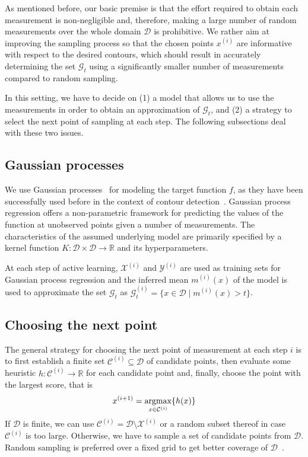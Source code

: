 \documentclass[11pt]{article} %
\newcommand{\argmax}{\operatornamewithlimits{argmax}}
\begin{document}
As mentioned before, our basic premise is that the effort required to obtain
each measurement is
non-negligible and, therefore, making a large number of random measurements
over the whole domain $\mathcal{D}$ is prohibitive. We rather aim at improving
the sampling process so that the chosen points $x^{(i)}$ are informative with
respect to the desired contours, which should result in accurately determining
the set $\mathcal{G}_t$ using a significantly smaller number of measurements
compared to random sampling.

In this setting, we have to decide on (1) a model that allows us to use the
measurements in order to obtain an approximation of $\mathcal{G}_t$, and (2) a
strategy to select the next point of sampling at each step. The following
subsections deal with these two issues.

\subsection{Gaussian processes}
We use Gaussian processes~\cite{gpbook} for modeling the target
function $f$, as they have been successfully used before in the context of
contour detection~\cite{bryan2005, bryan2008}. Gaussian process regression
offers a non-parametric framework for predicting the values of the function at
unobserved points given a number of measurements. The characteristics of
the assumed underlying model are primarily specified by a kernel function
${K : \mathcal{D} \times \mathcal{D} \to \mathbb{R}}$ and its hyperparameters.

At each step of active learning, $\mathcal{X}^{(i)}$ and $\mathcal{Y}^{(i)}$ are
used as training sets
for Gaussian process regression and the inferred mean $m^{(i)}(x)$ of the
model is used to approximate the set $\mathcal{G}_t$ as
${\mathcal{G}^{(i)}_t = \{x \in \mathcal{D} \mid m^{(i)}(x) > t\}}$.

\subsection{Choosing the next point}
The general strategy for choosing the next point of measurement at each step $i$
is to first establish a finite set $\mathcal{C}^{(i)} \subseteq \mathcal{D}$ of
candidate points, then evaluate some heuristic
${h : \mathcal{C}^{(i)} \to \mathbb{R}}$ for each candidate point and, finally,
choose the point with the largest score, that is
\begin{align*}
  x^{(i+1)} = \underset{x \in \mathcal{C}^{(i)}}{\argmax}\{h(x)\}
\end{align*}
If $\mathcal{D}$ is finite, we can use
$\mathcal{C}^{(i)} = \mathcal{D}\setminus\mathcal{X}^{(i)}$ or a random subset
thereof in case $\mathcal{C}^{(i)}$ is too large. Otherwise, we have to sample a set
of candidate points from $\mathcal{D}$. Random sampling is preferred over a
fixed grid to get better coverage of $\mathcal{D}$~\cite{bryan2005}.
\end{document}
